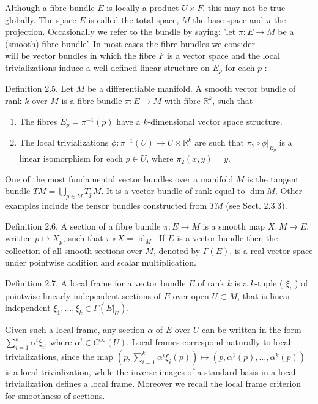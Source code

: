 \documentclass[10pt, letterpaper]{article}
\begin{document}
Although a fibre bundle $E$ is locally a product $U \times F$, this may not be true globally. The space $E$ is called the total space, $M$ the base space and $\pi$ the projection. Occasionally we refer to the bundle by saying: 'let $\pi: E \rightarrow M$ be a (smooth) fibre bundle'. In most cases the fibre bundles we consider\\
will be vector bundles in which the fibre $F$ is a vector space and the local trivializations induce a well-defined linear structure on $E_{p}$ for each $p$ :

Definition 2.5. Let $M$ be a differentiable manifold. A smooth vector bundle of rank $k$ over $M$ is a fibre bundle $\pi: E \rightarrow M$ with fibre $\mathbb{R}^{k}$, such that

\begin{enumerate}
  \item The fibres $E_{p}=\pi^{-1}(p)$ have a $k$-dimensional vector space structure.
  \item The local trivializations $\phi: \pi^{-1}(U) \rightarrow U \times \mathbb{R}^{k}$ are such that $\left.\pi_{2} \circ \phi\right|_{E_{p}}$ is a linear isomorphism for each $p \in U$, where $\pi_{2}(x, y)=y$.
\end{enumerate}

One of the most fundamental vector bundles over a manifold $M$ is the tangent bundle $T M=\bigcup_{p \in M} T_{p} M$. It is a vector bundle of rank equal to $\operatorname{dim} M$. Other examples include the tensor bundles constructed from $T M$ (see Sect. 2.3.3).

Definition 2.6. A section of a fibre bundle $\pi: E \rightarrow M$ is a smooth map $X: M \rightarrow E$, written $p \mapsto X_{p}$, such that $\pi \circ X=\operatorname{id}_{M}$. If $E$ is a vector bundle then the collection of all smooth sections over $M$, denoted by $\Gamma(E)$, is a real vector space under pointwise addition and scalar multiplication.

Definition 2.7. A local frame for a vector bundle $E$ of rank $k$ is a $k$-tuple ( $\xi_{i}$ ) of pointwise linearly independent sections of $E$ over open $U \subset M$, that is linear independent $\xi_{1}, \ldots, \xi_{k} \in \Gamma\left(\left.E\right|_{U}\right)$.

Given such a local frame, any section $\alpha$ of $E$ over $U$ can be written in the form $\sum_{i=1}^{k} \alpha^{i} \xi_{i}$, where $\alpha^{i} \in C^{\infty}(U)$. Local frames correspond naturally to local trivializations, since the map $\left(p, \sum_{i=1}^{k} \alpha^{i} \xi_{i}(p)\right) \mapsto\left(p, \alpha^{1}(p), \ldots, \alpha^{k}(p)\right)$ is a local trivialization, while the inverse images of a standard basis in a local trivialization defines a local frame. Moreover we recall the local frame criterion for smoothness of sections.
\end{document}
